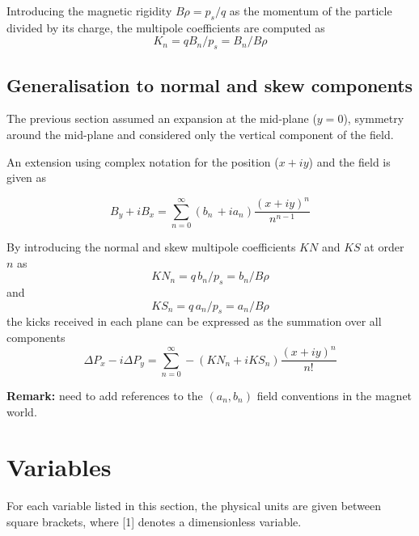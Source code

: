 Introducing the magnetic rigidity \(B \rho = p_s / q\) as the
momentum of the particle divided by its charge, the multipole
coefficients are computed as
\begin{equation}\label{eq:kn}
K_n = q B_n / p_s  =  B_n / B \rho 
\end{equation}

\begin{5.02.06}
\section{Generalisation to normal and skew components}
\label{sec:normalskew}
The previous section assumed an expansion at the mid-plane ($y=0$), 
symmetry around the mid-plane and considered only the vertical 
component of the field. 

An extension using complex notation for the position ($x + i y$) 
and the field is given as

\begin{equation}
B_y +  i B_x =\sum_{n=0}^{\infty} (b_n\,+ia_n) \frac{(x+iy)^n}{n^{n-1}}
\end{equation}

By introducing the normal and skew multipole coefficients 
$KN$ and $KS$ at order $n$ as
\begin{equation}\label{eq:knn}
KN_n = q\,b_n / p_s  =  b_n / B \rho 
\end{equation}
and
\begin{equation}\label{eq:kns}
KS_n = q\,a_n / p_s  =  a_n / B \rho 
\end{equation}
the kicks received in each plane can be expressed as the summation 
over all components
\begin{equation}
\Delta P_x - i \Delta P_y = \sum_{n=0}^{\infty} -(KN_n + i KS_n) \frac{(x+iy)^n}{n!}
\end{equation}

{\bf Remark:} need to add references to the $(a_n,b_n)$ field conventions 
in the magnet world. 

\end{5.02.06}

\section{Variables}
\label{sec:variables}

For each variable listed in this section, the physical units are given
between square brackets, where [1] denotes a dimensionless variable.

